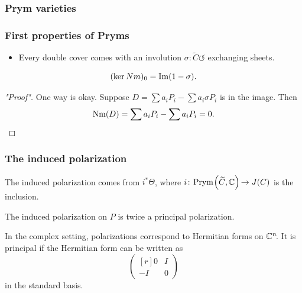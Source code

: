\begin{frame}
\frametitle{Prym varieties}



\end{frame}


\begin{frame}
\frametitle{First properties of Pryms}

\begin{itemize}
	\item Every double cover comes with an involution $\sigma \colon  \widetilde C \circlearrowleft$ exchanging sheets.
\end{itemize}


\begin{proposition}
\[
(\ker Nm)_0 = \operatorname{Im}(1-\sigma).
\]
\end{proposition}
\begin{proof}["Proof"]
One way is okay. Suppose $D= \sum a_i P_i - \sum a_i \sigma{P_i}$ is in the image. Then
\[
\operatorname{Nm}(D) = \sum a_i P_i - \sum a_i P_i = 0.
\]
\end{proof}
\end{frame}

\begin{frame}
\frametitle{The induced polarization}

The induced polarization comes from \alert{$i^\ast \Theta$}, where $i\colon\mkern-2mu\operatorname{Prym}\mkern-2mu\Big(\widetilde C, \mathbb{C}\Big)\mkern-2mu \to J(C)$ is the inclusion.

\begin{theorem}
The induced polarization on $P$ is twice a principal polarization.
\end{theorem}
\pause
\begin{remark}
In the complex setting, polarizations correspond to Hermitian forms on $\mathbb{C}^n\mkern-3mu$. It is principal if the Hermitian form can be written as 
\[
\begin{pmatrix*}[r]
0 & I \\
-I &0
\end{pmatrix*}
\]
in the standard basis.
\end{remark}
\end{frame}

